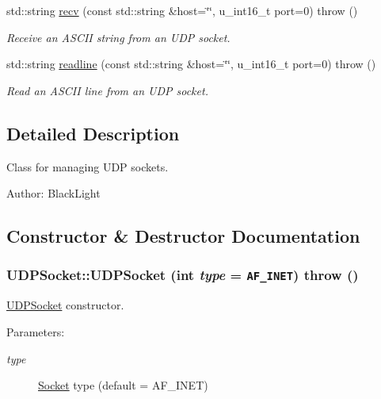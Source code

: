 \begin{CompactItemize}
std::string \hyperlink{classUDPSocket_688933363fb0b6b9819234dcfe13931b}{recv} (const std::string \&host=\char`\"{}\char`\"{}, u\_\-int16\_\-t port=0)  throw ()
\begin{CompactList}\small\item\em Receive an ASCII string from an UDP socket. \item\end{CompactList}\item 
std::string \hyperlink{classUDPSocket_212e096b3245ea32b66f43c592903838}{readline} (const std::string \&host=\char`\"{}\char`\"{}, u\_\-int16\_\-t port=0)  throw ()
\begin{CompactList}\small\item\em Read an ASCII line from an UDP socket. \item\end{CompactList}\end{CompactItemize}


\subsection{Detailed Description}
Class for managing UDP sockets. 

\begin{Desc}
\item[Author:]BlackLight \end{Desc}


\subsection{Constructor \& Destructor Documentation}
\hypertarget{classUDPSocket_7e2e6eb3a4c3eec5538bdfd89441802b}{
\subsubsection[{UDPSocket}]{\setlength{\rightskip}{0pt plus 5cm}UDPSocket::UDPSocket (int {\em type} = {\tt AF\_\-INET})  throw ()}}
\label{classUDPSocket_7e2e6eb3a4c3eec5538bdfd89441802b}


\hyperlink{classUDPSocket}{UDPSocket} constructor. 

\begin{Desc}
\item[Parameters:]
\begin{description}
\item[{\em type}]\hyperlink{classSocket}{Socket} type (default = AF\_\-INET) \end{description}
\end{Desc}


